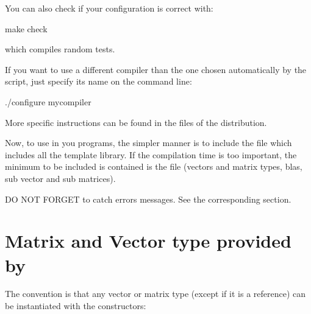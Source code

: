 \documentclass[a4paper,11pt,english]{sphinxmanual}
\begin{document}
\sphinxAtStartPar
You can also check if your configuration is correct with:

\begin{sphinxVerbatim}[commandchars=\\\{\}]
make check
\end{sphinxVerbatim}

\sphinxAtStartPar
which compiles random tests.

\sphinxAtStartPar
If you want to use a different compiler than the one chosen
automatically by the  script, just specify its
name on the command line:

\begin{sphinxVerbatim}[commandchars=\\\{\}]
./configure mycompiler
\end{sphinxVerbatim}

\sphinxAtStartPar
More specific instructions can be found in the  files of
the distribution.

\sphinxAtStartPar
Now, to use  in you programs, the simpler manner is to include the file  which includes all the template library. If the compilation time is too important, the minimum to be included is contained is the file  (vectors and matrix types, blas, sub vector and sub matrices).

\sphinxAtStartPar
DO NOT FORGET to catch errors messages. See the corresponding section.


\chapter{Matrix and Vector type provided by }
\label{\detokenize{gmm/matrix:matrix-and-vector-type-provided-by-gmm}}\label{\detokenize{gmm/matrix:gmm-matrix}}\label{\detokenize{gmm/matrix::doc}}
\sphinxAtStartPar
The convention is that any vector or matrix type (except if it is a  reference)
can be instantiated with the constructors:

\begin{sphinxVerbatim}[commandchars=\\\{\}]
         
       
\end{sphinxVerbatim}
\end{document}
